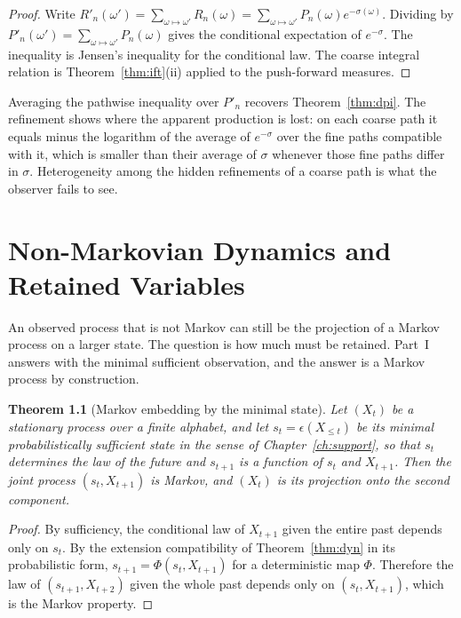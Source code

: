 \documentclass[11pt,oneside]{book}
\newtheorem{theorem}{Theorem}[chapter]
\theoremstyle{definition}
\theoremstyle{remark}
\begin{document}
\begin{proof}
Write $R'_n(\omega')=\sum_{\omega\mapsto\omega'}R_n(\omega)=\sum_{\omega\mapsto\omega'}P_n(\omega)e^{-\sigma(\omega)}$. Dividing by $P'_n(\omega')=\sum_{\omega\mapsto\omega'}P_n(\omega)$ gives the conditional expectation of $e^{-\sigma}$. The inequality is Jensen's inequality for the conditional law. The coarse integral relation is Theorem~\ref{thm:ift}(ii) applied to the push-forward measures.
\end{proof}

Averaging the pathwise inequality over $P'_n$ recovers Theorem~\ref{thm:dpi}. The refinement shows where the apparent production is lost: on each coarse path it equals minus the logarithm of the average of $e^{-\sigma}$ over the fine paths compatible with it, which is smaller than their average of $\sigma$ whenever those fine paths differ in $\sigma$. Heterogeneity among the hidden refinements of a coarse path is what the observer fails to see.

\chapter{Non-Markovian Dynamics and Retained Variables}\label{ch:nonmarkov}

An observed process that is not Markov can still be the projection of a Markov process on a larger state. The question is how much must be retained. Part~I answers with the minimal sufficient observation, and the answer is a Markov process by construction.

\begin{theorem}[Markov embedding by the minimal state]\label{thm:embedding}
Let $(X_t)$ be a stationary process over a finite alphabet, and let $s_t=\epsilon(X_{\leq t})$ be its minimal probabilistically sufficient state in the sense of Chapter~\ref{ch:support}, so that $s_t$ determines the law of the future and $s_{t+1}$ is a function of $s_t$ and $X_{t+1}$. Then the joint process $(s_t,X_{t+1})$ is Markov, and $(X_t)$ is its projection onto the second component.
\end{theorem}

\begin{proof}
By sufficiency, the conditional law of $X_{t+1}$ given the entire past depends only on $s_t$. By the extension compatibility of Theorem~\ref{thm:dyn} in its probabilistic form, $s_{t+1}=\Phi(s_t,X_{t+1})$ for a deterministic map $\Phi$. Therefore the law of $(s_{t+1},X_{t+2})$ given the whole past depends only on $(s_t,X_{t+1})$, which is the Markov property.
\end{proof}
\end{document}
